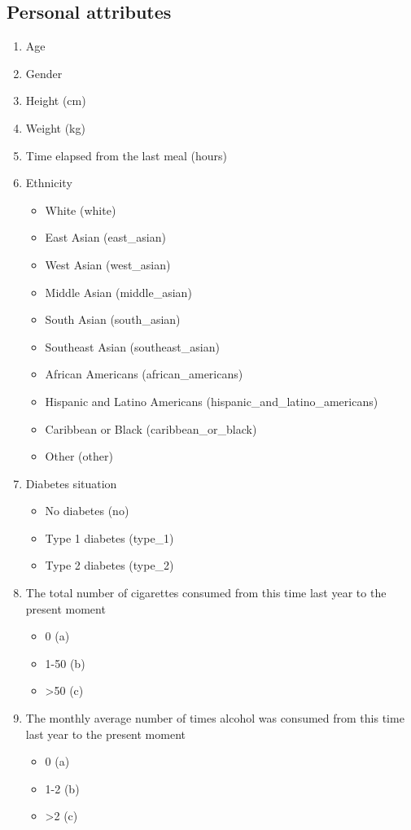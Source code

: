 \documentclass{article}
\begin{document}
\subsection{Personal attributes}
\begin{enumerate}
    \item Age
    \item Gender
    \item Height (cm)
    \item Weight (kg)
    \item Time elapsed from the last meal (hours)
    \item Ethnicity
    \begin{itemize}
        \item White (white)
        \item East Asian (east\_asian)
        \item West Asian (west\_asian)
        \item Middle Asian (middle\_asian)
        \item South Asian (south\_asian)
        \item Southeast Asian (southeast\_asian)
        \item African Americans (african\_americans)
        \item Hispanic and Latino Americans (hispanic\_and\_latino\_americans)
        \item Caribbean or Black (caribbean\_or\_black)
        \item Other (other)
    \end{itemize}
    \item Diabetes situation
    \begin{itemize}
        \item No diabetes (no)
        \item Type 1 diabetes (type\_1)
        \item Type 2 diabetes (type\_2)
    \end{itemize}
    \item The total number of cigarettes consumed from this time last year to the present moment
    \begin{itemize}
        \item 0 (a)
        \item 1-50 (b)
        \item >50 (c)
    \end{itemize}
    \item The monthly average number of times alcohol was consumed from this time last year to the present moment
    \begin{itemize}
        \item 0 (a)
        \item 1-2 (b)
        \item >2 (c)
    \end{itemize}
\end{enumerate}
\end{document}
